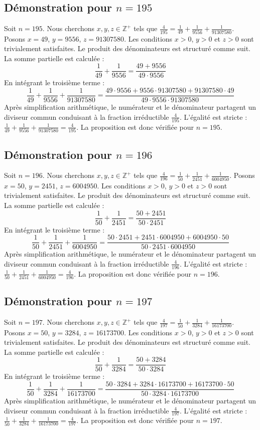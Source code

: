 \documentclass[11pt,a4paper]{article}
\begin{document}
\subsection{Démonstration pour $n = 195$}
Soit $n = 195$. Nous cherchons $x, y, z \in \mathbb{Z}^{+}$ tels que $\frac{4}{195} = \frac{1}{49} + \frac{1}{9556} + \frac{1}{91307580}$.
Posons $x = 49$, $y = 9556$, $z = 91307580$.
Les conditions $x > 0$, $y > 0$ et $z > 0$ sont trivialement satisfaites.
Le produit des dénominateurs est structuré comme suit. La somme partielle est calculée :
$$ \frac{1}{49} + \frac{1}{9556} = \frac{49+9556}{49 \cdot 9556} $$
En intégrant le troisième terme :
$$ \frac{1}{49} + \frac{1}{9556} + \frac{1}{91307580} = \frac{49 \cdot 9556 + 9556 \cdot 91307580 + 91307580 \cdot 49}{49 \cdot 9556 \cdot 91307580} $$
Après simplification arithmétique, le numérateur et le dénominateur partagent un diviseur commun conduisant à la fraction irréductible $\frac{4}{195}$.
L'égalité est stricte : $\frac{1}{49} + \frac{1}{9556} + \frac{1}{91307580} = \frac{4}{195}$.
La proposition est donc vérifiée pour $n = 195$.
\subsection{Démonstration pour $n = 196$}
Soit $n = 196$. Nous cherchons $x, y, z \in \mathbb{Z}^{+}$ tels que $\frac{4}{196} = \frac{1}{50} + \frac{1}{2451} + \frac{1}{6004950}$.
Posons $x = 50$, $y = 2451$, $z = 6004950$.
Les conditions $x > 0$, $y > 0$ et $z > 0$ sont trivialement satisfaites.
Le produit des dénominateurs est structuré comme suit. La somme partielle est calculée :
$$ \frac{1}{50} + \frac{1}{2451} = \frac{50+2451}{50 \cdot 2451} $$
En intégrant le troisième terme :
$$ \frac{1}{50} + \frac{1}{2451} + \frac{1}{6004950} = \frac{50 \cdot 2451 + 2451 \cdot 6004950 + 6004950 \cdot 50}{50 \cdot 2451 \cdot 6004950} $$
Après simplification arithmétique, le numérateur et le dénominateur partagent un diviseur commun conduisant à la fraction irréductible $\frac{4}{196}$.
L'égalité est stricte : $\frac{1}{50} + \frac{1}{2451} + \frac{1}{6004950} = \frac{4}{196}$.
La proposition est donc vérifiée pour $n = 196$.
\subsection{Démonstration pour $n = 197$}
Soit $n = 197$. Nous cherchons $x, y, z \in \mathbb{Z}^{+}$ tels que $\frac{4}{197} = \frac{1}{50} + \frac{1}{3284} + \frac{1}{16173700}$.
Posons $x = 50$, $y = 3284$, $z = 16173700$.
Les conditions $x > 0$, $y > 0$ et $z > 0$ sont trivialement satisfaites.
Le produit des dénominateurs est structuré comme suit. La somme partielle est calculée :
$$ \frac{1}{50} + \frac{1}{3284} = \frac{50+3284}{50 \cdot 3284} $$
En intégrant le troisième terme :
$$ \frac{1}{50} + \frac{1}{3284} + \frac{1}{16173700} = \frac{50 \cdot 3284 + 3284 \cdot 16173700 + 16173700 \cdot 50}{50 \cdot 3284 \cdot 16173700} $$
Après simplification arithmétique, le numérateur et le dénominateur partagent un diviseur commun conduisant à la fraction irréductible $\frac{4}{197}$.
L'égalité est stricte : $\frac{1}{50} + \frac{1}{3284} + \frac{1}{16173700} = \frac{4}{197}$.
La proposition est donc vérifiée pour $n = 197$.
\end{document}
